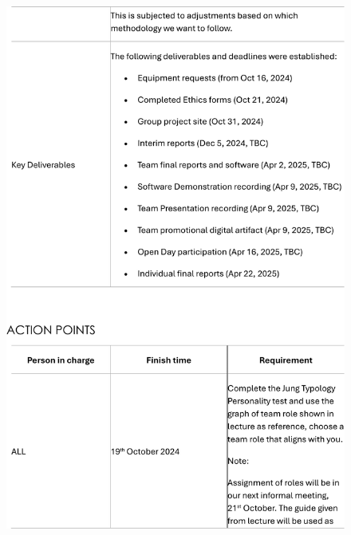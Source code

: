 \documentclass[a4paper,12pt, oneside]{report}
\begin{document}
\begin{appendices}
\begin{figure}[H]
    \includegraphics[width=\textwidth]{Minutes/Minutes_1-cropped-3.png}
\end{figure}
\newpage
\begin{figure}[H]
    \centering

\end{figure}
\end{appendices}
\end{document}
